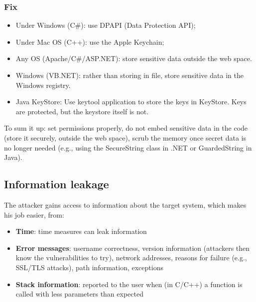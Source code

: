 \documentclass[a4paper, 10pt, titlepage]{article}
\begin{document}
\subsubsection*{Fix}
\begin{itemize}
\item Under Windows (C\#): use DPAPI (Data Protection API);
\item Under Mac OS (C++): use the Apple Keychain;
\item Any OS (Apache/C\#/ASP.NET): store sensitive data outside the web space.
\item Windows (VB.NET): rather than storing in file, store sensitive data in the Windows registry.
\item Java KeyStore: Use keytool application to store the keys in KeyStore. Keys are protected, but the keystore itself is not.
\end{itemize}
To sum it up: set permissions properly, do not embed sensitive data in the code (store it securely, outside the web space), scrub the memory once secret data is no longer needed (e.g., using the SecureString class in .NET or GuardedString in Java).

\subsection{Information leakage}
The attacker gains access to information about the target system, which makes his job easier, from:
\begin{itemize}
\item \textbf{Time}: time measures can leak information
\item \textbf{Error messages}: username correctness, version information
(attackers then know the vulnerabilities to try), network addresses, reasons for failure (e.g., SSL/TLS attacks), path information, exceptions
\item \textbf{Stack information}: reported to the user when (in C/C++) a function is called with less parameters than expected
\end{itemize}
\end{document}
